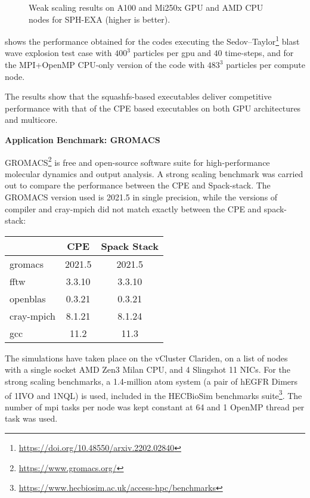 \begin{figure}[htp!]
    \begin{center}
        
        
        
    \end{center}
    \caption{Weak scaling results on A100 and Mi250x GPU and AMD CPU nodes for SPH-EXA (higher is better).}
    \label{fig:sph-weak}
\end{figure}

 shows the performance obtained for the codes executing the Sedov--Taylor\footnote{\url{https://doi.org/10.48550/arxiv.2202.02840}} blast wave explosion test case with $400^3$ particles per gpu and $40$ time-steps, and for the MPI+OpenMP CPU-only version of the code with $483^3$ particles per compute node.

The results show that the squashfs-based executables deliver competitive performance with that of the CPE based executables on both GPU architectures and multicore.

\noindent\textbf{Application Benchmark: GROMACS}

GROMACS\footnote{\url{https://www.gromacs.org/}} is free and open-source software suite for high-performance molecular dynamics and output analysis.
A strong scaling benchmark was carried out to compare the performance between the CPE and Spack-stack.
The GROMACS version used is 2021.5 in single precision, while the versions of compiler and cray-mpich did not match exactly between the CPE and spack-stack:
\begin{center}
    \begin{tabular}{l |c  c }
                      & CPE   & Spack Stack \\
          \hline
        gromacs       & 2021.5   & 2021.5   \\
        fftw          & 3.3.10   & 3.3.10   \\
        openblas      & 0.3.21   & 0.3.21   \\
        cray-mpich    & 8.1.21   & 8.1.24   \\
        gcc           & 11.2     & 11.3     \\
    \end{tabular}
\end{center}

The simulations have taken place on the vCluster Clariden, on a list of nodes with a single socket AMD Zen3 Milan CPU, and 4 Slingshot 11 NICs.
For the strong scaling benchmarks, a 1.4-million atom system (a pair of hEGFR Dimers of 1IVO and 1NQL) is used, included in the HECBioSim benchmarks suite\footnote{\url{https://www.hecbiosim.ac.uk/access-hpc/benchmarks}}.
The number of mpi tasks per node was kept constant at 64 and 1 OpenMP thread per task was used.

